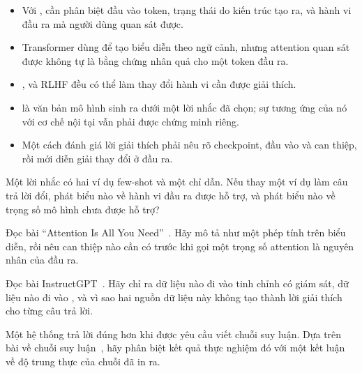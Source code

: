 \begin{tomtat}
\begin{itemize}
  \item Với , cần phân biệt đầu
  vào token, trạng thái do kiến trúc tạo ra,
  và hành vi đầu ra mà người dùng quan sát được.
  \item Transformer dùng  để tạo biểu diễn theo ngữ cảnh, nhưng
  attention quan sát được không tự là bằng chứng nhân quả cho một token đầu ra.
  \item {},  và RLHF đều có thể
  làm thay đổi hành vi cần được giải thích.
  \item {} là văn bản mô hình sinh ra dưới một
  lời nhắc đã chọn; sự tương ứng của nó với cơ chế nội tại vẫn phải được chứng
  minh riêng.
  \item Một cách đánh giá lời giải thích phải nêu rõ checkpoint, đầu vào và
  can thiệp, rồi mới diễn giải thay đổi ở đầu ra.
\end{itemize}
\end{tomtat}

\cauhoi
\begin{cauhoids}
  \item Một lời nhắc có hai ví dụ few-shot và một chỉ dẫn. Nếu thay một ví dụ
  làm câu trả lời đổi, phát biểu nào về hành vi đầu ra được hỗ trợ, và phát
  biểu nào về trọng số mô hình chưa được hỗ trợ?
  \item Đọc bài \enquote{Attention Is All You Need}~\autocite{p01attention}.
  Hãy mô tả  như một phép tính trên biểu diễn, rồi nêu can thiệp
  nào cần có trước khi gọi một trọng số attention là nguyên nhân của đầu ra.
  \item Đọc bài InstructGPT~\autocite{p04instructgpt}. Hãy chỉ ra dữ liệu nào
  đi vào tinh chỉnh có giám sát, dữ liệu nào đi vào ,
  và vì sao hai
  nguồn dữ liệu này không tạo thành lời giải thích cho từng câu trả lời.
  \item Một hệ thống trả lời đúng hơn khi được yêu cầu viết chuỗi suy luận.
  Dựa trên bài về chuỗi suy luận~\autocite{p06cot}, hãy phân biệt kết quả
  thực nghiệm đó với một kết luận về độ trung thực của chuỗi đã in ra.
\end{cauhoids}
